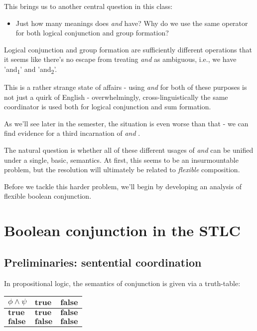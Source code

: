 \documentclass[letterpaper,parskip=half]{scrartcl}
\begin{document}
This brings us to another central question in this class:

\begin{itemize}
\item Just how many meanings does \emph{and} have? Why do we use the same operator for both logical conjunction and group formation?
\end{itemize}

Logical conjunction and group formation are sufficiently different operations that it seems like there's no escape from treating \emph{and} as ambiguous, i.e., we have 'and\textsubscript{1}' and 'and\textsubscript{2}'.

This is a rather strange state of affairs - using \emph{and} for both of these purposes is not just a quirk of English - overwhelmingly, cross-linguistically the same coordinator is used both for logical conjunction and sum formation.

As we'll see later in the semester, the situation is even worse than that - we can find evidence for a third incarnation of \emph{and} \autocite{Link1984}.

The natural question is whether all of these different usages of \emph{and} can be unified under a single, basic, semantics. At first, this seems to be an insurmountable problem, but the resolution will ultimately be related to \emph{flexible} composition.

Before we tackle this harder problem, we'll begin by developing an analysis of flexible boolean conjunction. 

\section{Boolean conjunction in the STLC}
\label{sec:orgb3990a2}

\subsection{Preliminaries: sentential coordination}
\label{sec:org3be82b1}

In propositional logic, the semantics of conjunction is given via a truth-table:

\begin{center}
\begin{tabular}{lll}
\(\phi \wedge \psi\) & \(\mathbf{true}\) & \(\mathbf{false}\)\\
\hline
\(\mathbf{true}\) & \(\mathbf{true}\) & \(\mathbf{false}\)\\
\(\mathbf{false}\) & \(\mathbf{false}\) & \(\mathbf{false}\)\\
\end{tabular}
\end{center}
\end{document}
